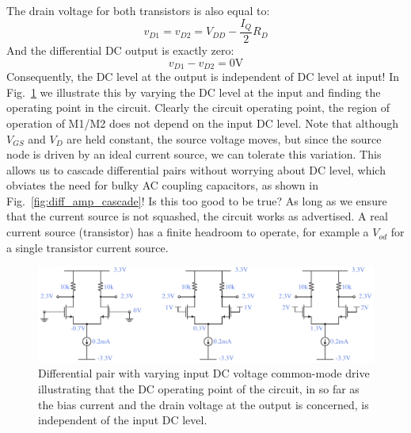 The drain voltage for both transistors is also equal to:
    \begin{equation}
        {v_{D1}} = {v_{D2}} = {V_{DD}} - \frac{I_Q}{2}{R_D}  
    \end{equation}
And the differential DC output is exactly zero:
    \begin{equation}
        {v_{D1}} - {v_{D2}} = 0\mathrm{V}
    \end{equation}
Consequently, the DC level at the output is independent of DC level at input! In Fig.~\ref{fig:diff_amp_bias_cm.pdf} we illustrate this by varying the DC level at the input and finding the operating point in the circuit.  Clearly the circuit operating point, the region of operation of M1/M2 does not depend on the input DC level.  Note that although $V_{GS}$ and $V_{D}$ are held constant, the source voltage moves, but since the source node is driven by an ideal current source, we can tolerate this variation.  This allows us to cascade differential pairs without worrying about DC level, which obviates the need for bulky AC coupling capacitors, as shown in Fig.~\ref{fig:diff_amp_cascade}! Is this too good to be true?  As long as we ensure that the current source is not squashed, the circuit works as advertised.  A real current source (transistor) has a finite headroom to operate, for example a $V_{od}$ for a single transistor current source.
\begin{figure}[tb]
\centering
\includegraphics[width=\columnwidth]{diff_amp_bias_cm.pdf}
\caption{Differential pair with varying input DC voltage common-mode drive illustrating that the DC operating point of the circuit, in so far as the bias current and the drain voltage at the output is concerned, is independent of the input DC level.}
\label{fig:diff_amp_bias_cm.pdf}
\end{figure}
